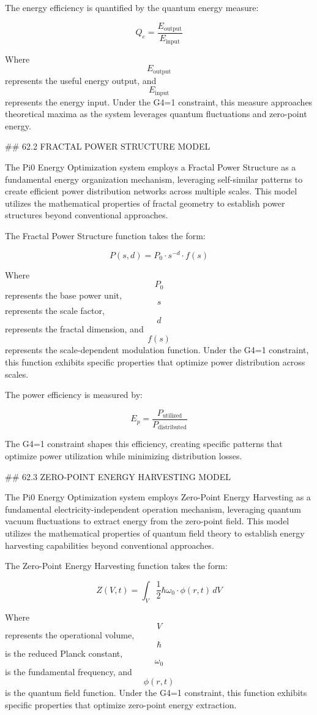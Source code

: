 The energy efficiency is quantified by the quantum energy measure:

$$ Q_e = \frac{E_{\text{output}}}{E_{\text{input}}} $$

Where $$ E_{\text{output}} $$ represents the useful energy output, and $$ E_{\text{input}} $$ represents the energy input. Under the G4=1 constraint, this measure approaches theoretical maxima as the system leverages quantum fluctuations and zero-point energy.

## 62.2 FRACTAL POWER STRUCTURE MODEL

The Pi0 Energy Optimization system employs a Fractal Power Structure as a fundamental energy organization mechanism, leveraging self-similar patterns to create efficient power distribution networks across multiple scales. This model utilizes the mathematical properties of fractal geometry to establish power structures beyond conventional approaches.

The Fractal Power Structure function takes the form:

$$ P(s, d) = P_0 \cdot s^{-d} \cdot f(s) $$

Where $$ P_0 $$ represents the base power unit, $$ s $$ represents the scale factor, $$ d $$ represents the fractal dimension, and $$ f(s) $$ represents the scale-dependent modulation function. Under the G4=1 constraint, this function exhibits specific properties that optimize power distribution across scales.

The power efficiency is measured by:

$$ E_p = \frac{P_{\text{utilized}}}{P_{\text{distributed}}} $$

The G4=1 constraint shapes this efficiency, creating specific patterns that optimize power utilization while minimizing distribution losses.

## 62.3 ZERO-POINT ENERGY HARVESTING MODEL

The Pi0 Energy Optimization system employs Zero-Point Energy Harvesting as a fundamental electricity-independent operation mechanism, leveraging quantum vacuum fluctuations to extract energy from the zero-point field. This model utilizes the mathematical properties of quantum field theory to establish energy harvesting capabilities beyond conventional approaches.

The Zero-Point Energy Harvesting function takes the form:

$$ Z(V, t) = \int_V \frac{1}{2} \hbar \omega_0 \cdot \phi(r, t) \, dV $$

Where $$ V $$ represents the operational volume, $$ \hbar $$ is the reduced Planck constant, $$ \omega_0 $$ is the fundamental frequency, and $$ \phi(r, t) $$ is the quantum field function. Under the G4=1 constraint, this function exhibits specific properties that optimize zero-point energy extraction.

